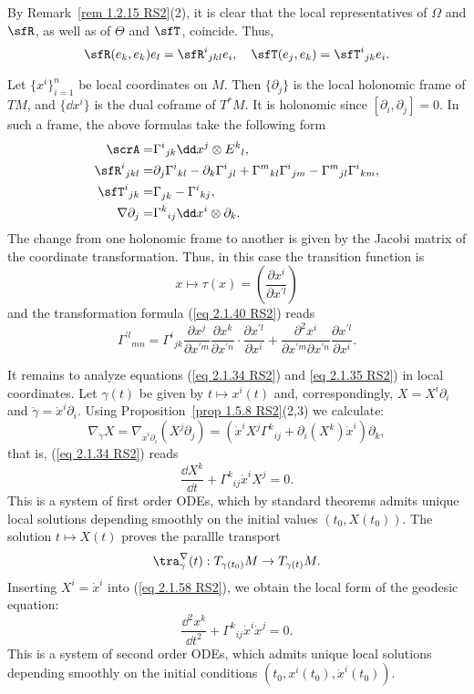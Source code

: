 \begin{rem}\label{rem 2.1.28 RS2}
    By Remark~\ref{rem 1.2.15 RS2}(2), it is clear that the local representatives of $\Omega$ and $\sfR$, as well as of $\Theta$ and $\sfT$, coincide. Thus,
    \[\sfR(e_k,e_k)e_l=\sfR^i{}_{jkl}e_i,\quad \sfT(e_j,e_k)=\sfT^i{}_{jk}e_i.\]
\end{rem}

\begin{rem}\label{rem 2.1.29 RS2}
    Let $\{x^i\}_{i=1}^n$ be local coordinates on $M$. Then $\{\partial_j\}$ is the local holonomic frame of $TM$, and $\{\dd x^i\}$ is the dual coframe of $T^\ast M$. It is holonomic since $[\partial_i,\partial_j]=0$. In such a frame, the above formulas take the following form 
    \begin{align}
        \scrA=&\Gamma^i{}_{jk}\dd x^j\otimes E^k{}_l,\\
        \sfR^i{}_{jkl}=&\partial_j\Gamma^i{}_{kl}-\partial_k\Gamma^i{}_{jl}+\Gamma^m{}_{kl}\Gamma^i{}_{jm}-\Gamma^m{}_{jl}\Gamma^i{}_{km},\\
        \sfT^i{}_{jk}=&\Gamma^{}_{jk}-\Gamma^i{}_{kj},\\
        \nabla\partial_j=&\Gamma^k{}_{ij}\dd x^i\otimes\partial_k.
    \end{align}
    The change from one holonomic frame to another is given by the Jacobi matrix of the coordinate transformation. Thus, in this case the transition function is 
    \[x\mapsto \tau(x)=\left(\frac{\partial x^i}{\partial x^{\prime l}}\right)\]
    and the transformation formula (\ref{eq 2.1.40 RS2}) reads 
    \[\Gamma^{\prime l}{}_{mn}=
    \Gamma^i{}_{jk}\frac{\partial x^j}{\partial x^{\prime m}}  \frac{\partial x^k}{\partial x^{\prime n}}\cdot \frac{\partial x^{\prime l}}{\partial x^i}+
    \frac{\partial^2 x^i}{\partial x^{\prime m}\partial x^{\prime n}}\frac{\partial x^{\prime l}}{\partial x^i}.
    \]
\end{rem}


It remains to analyze equations (\ref{eq 2.1.34 RS2}) and \ref{eq 2.1.35 RS2}) in local coordinates. Let $\gamma(t)$ be given by $t\mapsto x^i(t)$ and, correspondingly, $X=X^i\partial_i$ and $\dot\gamma=\dot x^i\partial_i$. Using Proposition~\ref{prop 1.5.8 RS2}(2,3) we calculate:
\[\nabla_{\dot\gamma}X=\nabla_{\dot x^i\partial_i}(X^j\partial_j)=(\dot x^iX^j\Gamma^k{}_{ij}+\partial_i(X^k)\dot x^i)\partial_k,\]
that is, (\ref{eq 2.1.34 RS2}) reads 
\[\frac{\dd X^k}{\dd t}+\Gamma^k{}_{ij}\dot x^i X^j=0.\label{eq 2.1.58 RS2}\]
This is a system of first order ODEs, which by standard theorems admits unique local solutions depending smoothly on the initial values $(t_0,X(t_0))$. The solution $t\mapsto X(t)$ proves the parallle transport 
\[\tra_{\gamma}^{\nabla}(t):T_{\gamma(t_0)}M\to T_{\gamma(t)}M.\]
Inserting $X^i=\dot x^i$ into (\ref{eq 2.1.58 RS2}), we obtain the local form of the geodesic equation:
\[\frac{\dd^2 x^k}{\dd t^2}+\Gamma^k{}_{ij}\dot x^i\dot x^j=0.\]
This is a system of second order ODEs, which admits unique local solutions depending smoothly on the initial conditions $(t_0,x^i(t_0),\dot x^i(t_0))$.


